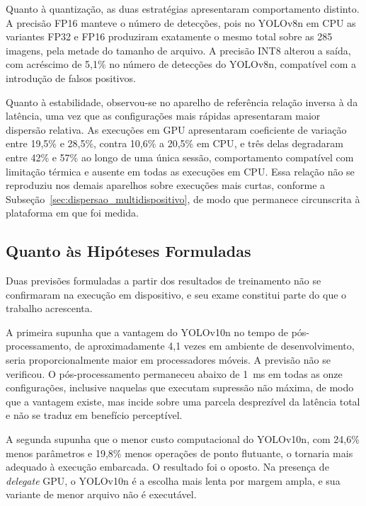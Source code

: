 \documentclass[artigo,times,capa]{iftex2024}
\begin{document}
Quanto à quantização, as duas estratégias apresentaram comportamento distinto. A precisão \ac{FP16} manteve o número de detecções, pois no YOLOv8n em \ac{CPU} as variantes \ac{FP32} e \ac{FP16} produziram exatamente o mesmo total sobre as 285 imagens, pela metade do tamanho de arquivo. A precisão \ac{INT8} alterou a saída, com acréscimo de 5,1\% no número de detecções do YOLOv8n, compatível com a introdução de falsos positivos.

Quanto à estabilidade, observou-se no aparelho de referência relação inversa à da latência, uma vez que as configurações mais rápidas apresentaram maior dispersão relativa. As execuções em \ac{GPU} apresentaram coeficiente de variação entre 19,5\% e 28,5\%, contra 10,6\% a 20,5\% em \ac{CPU}, e três delas degradaram entre 42\% e 57\% ao longo de uma única sessão, comportamento compatível com limitação térmica e ausente em todas as execuções em \ac{CPU}. Essa relação não se reproduziu nos demais aparelhos sobre execuções mais curtas, conforme a Subseção~\ref{sec:dispersao_multidispositivo}, de modo que permanece circunscrita à plataforma em que foi medida.

\subsection{Quanto às Hipóteses Formuladas}

Duas previsões formuladas a partir dos resultados de treinamento não se confirmaram na execução em dispositivo, e seu exame constitui parte do que o trabalho acrescenta.

A primeira supunha que a vantagem do YOLOv10n no tempo de pós-processamento, de aproximadamente 4,1 vezes em ambiente de desenvolvimento, seria proporcionalmente maior em processadores móveis. A previsão não se verificou. O pós-processamento permaneceu abaixo de 1~ms em todas as onze configurações, inclusive naquelas que executam supressão não máxima, de modo que a vantagem existe, mas incide sobre uma parcela desprezível da latência total e não se traduz em benefício perceptível.

A segunda supunha que o menor custo computacional do YOLOv10n, com 24,6\% menos parâmetros e 19,8\% menos operações de ponto flutuante, o tornaria mais adequado à execução embarcada. O resultado foi o oposto. Na presença de \textit{delegate} \ac{GPU}, o YOLOv10n é a escolha mais lenta por margem ampla, e sua variante de menor arquivo não é executável.
\end{document}
